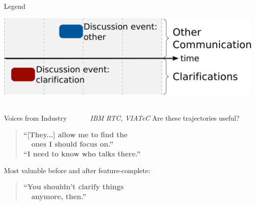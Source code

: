 \documentclass[final]{beamer} %
\newcommand{\marker}[1]{\textbf{\color{knaccentcolor1} #1}}
\begin{document}
\begin{frame}{}
\begin{columns}[t]
\begin{column}{.45\linewidth}

    
\begin{block}{Legend}
\begin{center}
\vspace{-0.5cm}
\includegraphics[width=0.9\linewidth]{img/pattern-legend} ~
\end{center}
\vspace{-0.5cm}
\end{block}

\begin{block}{Voices from Industry  \emph{\footnotesize ~~~~~~IBM RTC, VIATeC}}
\vspace{-0.4cm}
{\small Are these trajectories useful?}
\begin{quote}
\marker{“[They...] allow me to find the \\ ~~ones I should focus on.” \\ “I need to know who talks there.”}
\end{quote}
{\small Most valuable before and after feature-complete:}
\begin{quote}
\marker{“You shouldn’t clarify things \\~~anymore, then.”}
\end{quote}
\end{block}
\end{column}



\end{columns}
\end{frame}
\end{document}
